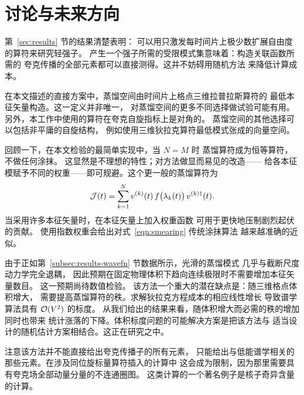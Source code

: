 \section{讨论与未来方向 \label{sec:discussion}}

第~\ref{sec:results} 节的结果清楚表明：
可以用只激发每时间片上极少数扩展自由度的算符来研究轻强子。
产生一个强子所需的受限模式集意味着：构造关联函数所需的
夸克传播的全部元素都可以直接测得。这并不妨碍用随机方法
\cite{Foley:2005ac} 来降低计算成本。

在本文描述的直接方案中，蒸馏空间由时间片上格点三维拉普拉斯算符的
最低本征矢量构造。这一定义并非唯一，
对蒸馏空间的更多不同选择做试验可能有用。
另外，本工作中使用的算符在夸克自旋指标上是对角的。
蒸馏空间的其他选择可以包括非平庸的自旋结构，
例如使用三维狄拉克算符最低模式张成的向量空间。

回顾一下，在本文检验的最简单实现中，当 $N=M$ 时
蒸馏算符成为恒等算符，不做任何涂抹。
这显然是不理想的特性；对方法做显而易见的改造——
给各本征模赋予不同的权重——即可规避。这个更一般的蒸馏算符为
\begin{equation}
        {\cal J}(t) = \sum_{k=1}^N v^{(k)}(t) \, f\big(\lambda_k(t)\big)
              \, v^{(k)\dag}(t).
\end{equation}
当采用许多本征矢量时，在本征矢量上加入权重函数
可用于更快地压制剧烈起伏的贡献。
使用指数权重会给出对式~\ref{eqn:smearing} 传统涂抹算法
越来越准确的近似。

由于正如第~\ref{subsec:results-wavefn} 节数据所示，光滑的蒸馏模式
几乎与截断尺度动力学完全退耦，
因此预期在固定物理体积下趋向连续极限时不需要增加本征矢量数目。
这一预期尚待数值检验。
该方法一个重大的潜在缺点是：随三维格点体积增大，
需要提高蒸馏算符的秩。求解狄拉克方程成本的相应线性增长
导致谱学算法具有 ${\cal O}(V^2)$ 的标度。
从我们给出的结果来看，随体积增大而必需的秩的增加同时也带来
统计涨落的下降。体积标度问题的可能解决方案是把该方法与
适当设计的随机估计方案相结合。这正在研究之中。

注意该方法并不能直接给出夸克传播子的所有元素，
只能给出与低能谱学相关的那些元素。在涉及同位旋标量算符插入的计算中
这会成为限制，因为那里需要具有夸克场全部动量分量的不连通圈图。
这类计算的一个著名例子是核子奇异含量的计算。
